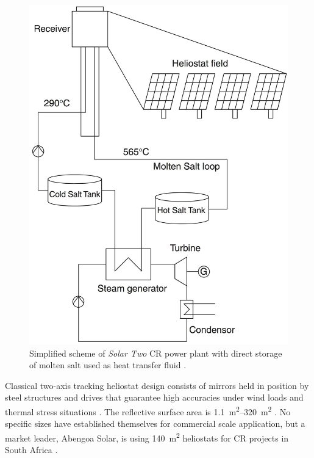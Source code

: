 \begin{figure}[htbp]  
\centering
\includegraphics[width=0.45\linewidth]{FIG/towerdirecttwotank}
\caption[Simplified scheme of \emph{Solar Two} \ac{CR} power plant with direct storage of molten salt used as heat transfer fluid.]{Simplified scheme of \emph{Solar Two} \ac{CR} power plant with direct storage of molten salt used as heat transfer fluid \cite{Richter2013}.}\label{towerdirecttwotank}
\end{figure}


Classical two-axis tracking heliostat design consists of mirrors held in position by steel structures and drives that guarantee high accuracies under wind loads and thermal stress situations \cite{Alexopoulos2013}. The reflective surface area is \SIrange{1.1}{320}{\square\metre} \cite{Blackmon2012,Tyner2014}. No specific sizes have established themselves for commercial scale application, but a market leader, Abengoa Solar, is using \SI{140}{\square\metre} heliostats for CR projects in South Africa \cite{Abengoa2014}.

